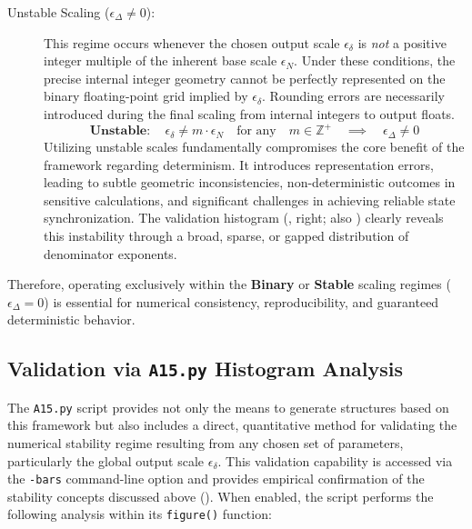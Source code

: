 \documentclass[10pt]{article}
\begin{document}
\begin{description}
    \item[Unstable Scaling ($\epsilon_\Delta \neq 0$):] This regime occurs whenever the chosen output scale $\epsilon_\delta$ is \emph{not} a positive integer multiple of the inherent base scale $\epsilon_N$. Under these conditions, the precise internal integer geometry cannot be perfectly represented on the binary floating-point grid implied by $\epsilon_\delta$. Rounding errors are necessarily introduced during the final scaling from internal integers to output floats.
    \begin{equation}\label{eq-scaling-unstable}
    \textbf{Unstable}: \quad \epsilon_\delta \neq m \cdot \epsilon_N \quad \text{for any} \quad m \in \mathbb{Z}^+ \quad \implies \quad \epsilon_\Delta \neq 0
    \end{equation}
    Utilizing unstable scales fundamentally compromises the core benefit of the framework regarding determinism. It introduces representation errors, leading to subtle geometric inconsistencies, non-deterministic outcomes in sensitive calculations, and significant challenges in achieving reliable state synchronization. The validation histogram (, right; also ) clearly reveals this instability through a broad, sparse, or gapped distribution of denominator exponents.
\end{description}
Therefore, operating exclusively within the \textbf{Binary} or \textbf{Stable} scaling regimes ($\epsilon_\Delta = 0$) is essential for numerical consistency, reproducibility, and guaranteed deterministic behavior.

\subsection{Validation via \texttt{A15.py} Histogram Analysis}\label{subsec-stability-validation}

The \texttt{A15.py} script provides not only the means to generate structures based on this framework but also includes a direct, quantitative method for validating the numerical stability regime resulting from any chosen set of parameters, particularly the global output scale $\epsilon_\delta$. This validation capability is accessed via the \texttt{-bars} command-line option and provides empirical confirmation of the stability concepts discussed above (). When enabled, the script performs the following analysis within its \texttt{figure()} function:
\end{document}
